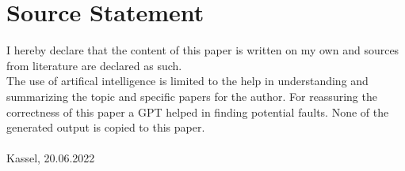 \chapter{Source Statement}
I hereby declare that the content of this paper is written on my own and sources from literature are declared as such.\\
The use of artifical intelligence is limited to the help in understanding and summarizing the topic and specific papers for the author. For reassuring the correctness of this paper a GPT helped in finding potential faults. None of the generated output is copied to this paper. \vspace{3cm}\\
\underline{\hspace{10cm}}\\
\footnotesize Kassel, 20.06.2022 \normalsize

